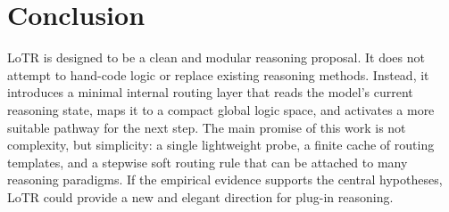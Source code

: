 \documentclass[11pt]{article}
\begin{document}
\section{Conclusion}

LoTR is designed to be a clean and modular reasoning proposal. It does not attempt to hand-code logic or replace existing reasoning methods. Instead, it introduces a minimal internal routing layer that reads the model's current reasoning state, maps it to a compact global logic space, and activates a more suitable pathway for the next step. The main promise of this work is not complexity, but simplicity: a single lightweight probe, a finite cache of routing templates, and a stepwise soft routing rule that can be attached to many reasoning paradigms. If the empirical evidence supports the central hypotheses, LoTR could provide a new and elegant direction for plug-in reasoning.
\end{document}
